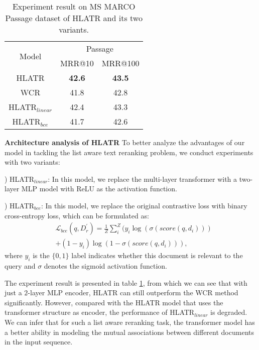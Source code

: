 \documentclass[11pt]{article}
\begin{document}
\begin{table}[]
\centering
\caption{Experiment result on MS MARCO Passage dataset of HLATR and its two variants.}
\label{tab:exp-variants}
\begin{tabular}{@{}c|cc@{}}
\toprule
\multirow{2}{*}{Model} & \multicolumn{2}{c}{Passage} \\ \cmidrule(l){2-3} 
                       & MRR@10       & MRR@100      \\ \midrule
HLATR                   & {\bf 42.6}         & {\bf 43.5}         \\
WCR         & 41.8         & 42.8         \\
HLATR$_{linear}$            & 42.4         & 43.3         \\
HLATR$_{bce}$               & 41.7         & 42.6         \\ \bottomrule
\end{tabular}
\end{table}

\vspace{0.15cm}
\noindent \textbf{Architecture analysis of HLATR} To better analyze the advantages of our model in tackling the list aware text reranking problem, we conduct experiments with two variants:

) HLATR$_{linear}$: In this model, we replace the multi-layer transformer with a two-layer MLP model with ReLU as the activation function.

) HLATR$_{bce}$: In this model, we replace the original contrastive loss with binary cross-entropy loss, which can be formulated as:
\begin{align*}
    & \mathcal{L}_{bce}(q,D_r^{'}) = \frac{1}{Z}\sum_i^Z(y_i\log(\sigma(score(q,d_i))) \\
    &+(1-y_i)\log(1-\sigma(score(q,d_i))),
\end{align*}
where $y_i$ is the $\{0,1\}$ label indicates whether this document is relevant to the query and $\sigma$ denotes the sigmoid activation function.

The experiment result is presented in table \ref{tab:exp-variants}, from which we can see that with just a $2$-layer MLP encoder, HLATR can still outperform the WCR method significantly. However, compared with the HLATR model that uses the transformer structure as encoder, the performance of HLATR$_{linear}$ is degraded. We can infer that for such a list aware reranking task, the transformer model has a better ability in modeling the mutual associations between different documents in the input sequence.
\end{document}
